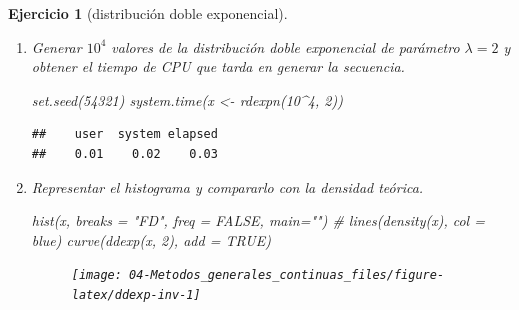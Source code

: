 \documentclass[
]{book}
\newenvironment{Shaded}{\begin{snugshade}}{\end{snugshade}}
\newcommand{\AttributeTok}[1]{\textcolor[rgb]{0.77,0.63,0.00}{#1}}
\newcommand{\CommentTok}[1]{\textcolor[rgb]{0.56,0.35,0.01}{\textit{#1}}}
\newcommand{\ConstantTok}[1]{\textcolor[rgb]{0.00,0.00,0.00}{#1}}
\newcommand{\ControlFlowTok}[1]{\textcolor[rgb]{0.13,0.29,0.53}{\textbf{#1}}}
\newcommand{\DecValTok}[1]{\textcolor[rgb]{0.00,0.00,0.81}{#1}}
\newcommand{\FunctionTok}[1]{\textcolor[rgb]{0.00,0.00,0.00}{#1}}
\newcommand{\NormalTok}[1]{#1}
\newcommand{\OtherTok}[1]{\textcolor[rgb]{0.56,0.35,0.01}{#1}}
\newcommand{\SpecialCharTok}[1]{\textcolor[rgb]{0.00,0.00,0.00}{#1}}
\newcommand{\StringTok}[1]{\textcolor[rgb]{0.31,0.60,0.02}{#1}}
\theoremstyle{break}
\newtheorem{exercise}{Ejercicio}[chapter]
\theoremstyle{nonumberplain}
\begin{document}
\begin{exercise}[distribución doble exponencial]
\begin{enumerate}
\begin{Shaded}
\begin{Highlighting}[]
\NormalTok{rdexpn }\OtherTok{\textless{}{-}} \ControlFlowTok{function}\NormalTok{(}\AttributeTok{n =} \DecValTok{1000}\NormalTok{, }\AttributeTok{lambda =} \DecValTok{1}\NormalTok{) \{}
\CommentTok{\# Simulación n valores de doble exponencial}
\NormalTok{    x }\OtherTok{\textless{}{-}} \FunctionTok{numeric}\NormalTok{(n)}
    \ControlFlowTok{for}\NormalTok{(i }\ControlFlowTok{in} \DecValTok{1}\SpecialCharTok{:}\NormalTok{n) x[i]}\OtherTok{\textless{}{-}}\FunctionTok{rdexp}\NormalTok{(lambda)}
    \FunctionTok{return}\NormalTok{(x)}
\NormalTok{\}}
\end{Highlighting}
\end{Shaded}
\item
  Generar \(10^{4}\) valores de la distribución doble exponencial de
  parámetro \(\lambda=2\) y obtener el tiempo de CPU que tarda en
  generar la secuencia.

\begin{Shaded}
\begin{Highlighting}[]
\FunctionTok{set.seed}\NormalTok{(}\DecValTok{54321}\NormalTok{)}
\FunctionTok{system.time}\NormalTok{(x }\OtherTok{\textless{}{-}} \FunctionTok{rdexpn}\NormalTok{(}\DecValTok{10}\SpecialCharTok{\^{}}\DecValTok{4}\NormalTok{, }\DecValTok{2}\NormalTok{))}
\end{Highlighting}
\end{Shaded}

\begin{verbatim}
##    user  system elapsed 
##    0.01    0.02    0.03
\end{verbatim}
\item
  Representar el histograma y compararlo con la densidad teórica.

\begin{Shaded}
\begin{Highlighting}[]
\FunctionTok{hist}\NormalTok{(x, }\AttributeTok{breaks =} \StringTok{"FD"}\NormalTok{, }\AttributeTok{freq =} \ConstantTok{FALSE}\NormalTok{, }\AttributeTok{main=}\StringTok{""}\NormalTok{)}
\CommentTok{\# lines(density(x), col = \textquotesingle{}blue\textquotesingle{})}
\FunctionTok{curve}\NormalTok{(}\FunctionTok{ddexp}\NormalTok{(x, }\DecValTok{2}\NormalTok{), }\AttributeTok{add =} \ConstantTok{TRUE}\NormalTok{)}
\end{Highlighting}
\end{Shaded}

  \begin{figure}[!htb]

  {\centering \texttt{[image: 04-Metodos\_generales\_continuas\_files/figure-latex/ddexp-inv-1]} 

}
\end{figure}
\end{enumerate}
\end{exercise}
\end{document}
